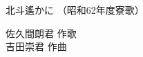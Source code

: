 \documentclass[10pt,b5j]{tarticle} %
\begin{document}
\begin{minipage}[c]{0.7\hsize} %
    \begin{center}
        {\LARGE
            北斗遙かに %
        }
        {\small 
            （昭和62年度寮歌） %
        }
    \end{center}
\end{minipage}
\begin{minipage}[c]{0.3\hsize} %
    \begin{flushright} %
        佐久間朗君 作歌\\吉田崇君 作曲 %
    \end{flushright}
\end{minipage}
\end{document}
